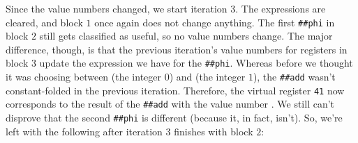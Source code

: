Since the value numbers changed, we start iteration $3$.  The expressions are
cleared, and block $1$ once again does not change anything.  The first
\Verb|##phi| in block $2$ still gets classified as useful, so no value
numbers change.  The major difference, though, is that the previous iteration's
value numbers for registers in block $3$ update the expression we have for the
\Verb|##phi|.  Whereas before we thought it was choosing between  (the
integer $0$) and  (the integer $1$), the \Verb|##add| wasn't
constant-folded in the previous iteration.  Therefore, the virtual register
\Verb|41| now corresponds to the result of the \Verb|##add| with the value
number .  We still can't disprove that the second \Verb|##phi| is
different (because it, in fact, isn't).  So, we're left with the following
after iteration $3$ finishes with block $2$:
%
